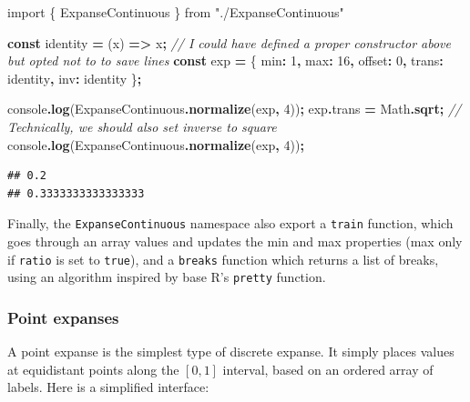 \documentclass[
]{book}
\newenvironment{Shaded}{\begin{snugshade}}{\end{snugshade}}
\newcommand{\AttributeTok}[1]{\textcolor[rgb]{0.13,0.29,0.53}{#1}}
\newcommand{\BuiltInTok}[1]{#1}
\newcommand{\CommentTok}[1]{\textcolor[rgb]{0.56,0.35,0.01}{\textit{#1}}}
\newcommand{\DecValTok}[1]{\textcolor[rgb]{0.00,0.00,0.81}{#1}}
\newcommand{\FunctionTok}[1]{\textcolor[rgb]{0.13,0.29,0.53}{\textbf{#1}}}
\newcommand{\ImportTok}[1]{#1}
\newcommand{\KeywordTok}[1]{\textcolor[rgb]{0.13,0.29,0.53}{\textbf{#1}}}
\newcommand{\NormalTok}[1]{#1}
\newcommand{\OperatorTok}[1]{\textcolor[rgb]{0.81,0.36,0.00}{\textbf{#1}}}
\newcommand{\StringTok}[1]{\textcolor[rgb]{0.31,0.60,0.02}{#1}}
\theoremstyle{definition}
\theoremstyle{definition}
\theoremstyle{definition}
\theoremstyle{definition}
\theoremstyle{remark}
\begin{document}
\begin{Shaded}
\begin{Highlighting}[]
\ImportTok{import}\NormalTok{ \{ ExpanseContinuous \} }\ImportTok{from} \StringTok{"./ExpanseContinuous"}

\KeywordTok{const}\NormalTok{ identity }\OperatorTok{=}\NormalTok{ (x) }\KeywordTok{=\textgreater{}}\NormalTok{ x}\OperatorTok{;}
\CommentTok{// I could have defined a proper constructor above but opted not to to save lines}
\KeywordTok{const}\NormalTok{ exp }\OperatorTok{=}\NormalTok{ \{ min}\OperatorTok{:} \DecValTok{1}\OperatorTok{,}\NormalTok{ max}\OperatorTok{:} \DecValTok{16}\OperatorTok{,}\NormalTok{ offset}\OperatorTok{:} \DecValTok{0}\OperatorTok{,}\NormalTok{ trans}\OperatorTok{:}\NormalTok{ identity}\OperatorTok{,}\NormalTok{ inv}\OperatorTok{:}\NormalTok{ identity \}}\OperatorTok{;}

\BuiltInTok{console}\OperatorTok{.}\FunctionTok{log}\NormalTok{(ExpanseContinuous}\OperatorTok{.}\FunctionTok{normalize}\NormalTok{(exp}\OperatorTok{,} \DecValTok{4}\NormalTok{))}\OperatorTok{;}
\NormalTok{exp}\OperatorTok{.}\AttributeTok{trans} \OperatorTok{=} \BuiltInTok{Math}\OperatorTok{.}\FunctionTok{sqrt}\OperatorTok{;} \CommentTok{// Technically, we should also set inverse to square}
\BuiltInTok{console}\OperatorTok{.}\FunctionTok{log}\NormalTok{(ExpanseContinuous}\OperatorTok{.}\FunctionTok{normalize}\NormalTok{(exp}\OperatorTok{,} \DecValTok{4}\NormalTok{))}\OperatorTok{;}
\end{Highlighting}
\end{Shaded}

\begin{verbatim}
## 0.2
## 0.3333333333333333
\end{verbatim}

Finally, the \texttt{ExpanseContinuous} namespace also export a \texttt{train} function, which goes through an array values and updates the min and max properties (max only if \texttt{ratio} is set to \texttt{true}), and a \texttt{breaks} function which returns a list of breaks, using an algorithm inspired by base R's \texttt{pretty} function.

\subsubsection{Point expanses}\label{point-expanses}

A point expanse is the simplest type of discrete expanse. It simply places values at equidistant points along the \([0, 1]\) interval, based on an ordered array of labels. Here is a simplified interface:
\end{document}
